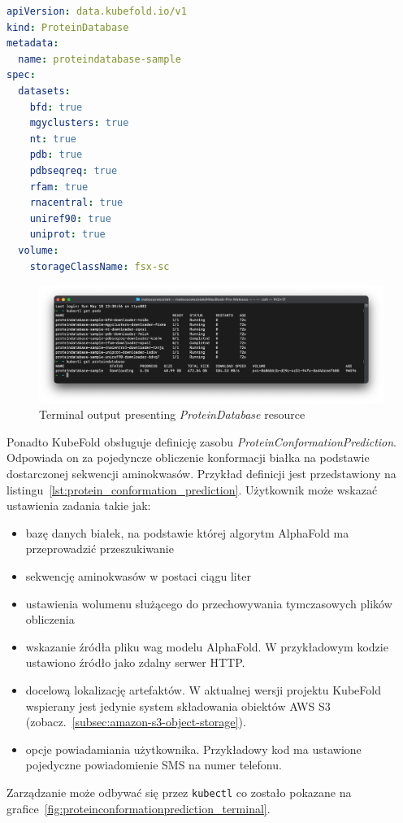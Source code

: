 \begin{lstlisting}[language=yaml,caption={Przykładowy kod YAML zasobu ProteinDatabase},label={lst:protein_database}]
apiVersion: data.kubefold.io/v1
kind: ProteinDatabase
metadata:
  name: proteindatabase-sample
spec:
  datasets:
    bfd: true
    mgyclusters: true
    nt: true
    pdb: true
    pdbseqreq: true
    rfam: true
    rnacentral: true
    uniref90: true
    uniprot: true
  volume:
    storageClassName: fsx-sc
\end{lstlisting}

\begin{figure}[htbp]
    \centering
    \includegraphics[width=\textwidth]{images/proteindatabase_terminal}
    \caption{Terminal output presenting \textit{ProteinDatabase} resource}
    \label{fig:proteindatabase_terminal}
\end{figure}

Ponadto KubeFold obsługuje definicję zasobu \textit{ProteinConformationPrediction}.
Odpowiada on za pojedyncze obliczenie konformacji białka na podstawie dostarczonej sekwencji aminokwasów.
Przykład definicji jest przedstawiony na listingu~\ref{lst:protein_conformation_prediction}.
Użytkownik może wskazać ustawienia zadania takie jak:
\begin{itemize}
    \item bazę danych białek, na podstawie której algorytm AlphaFold ma przeprowadzić przeszukiwanie
    \item sekwencję aminokwasów w postaci ciągu liter
    \item ustawienia wolumenu służącego do przechowywania tymczasowych plików obliczenia
    \item wskazanie źródła pliku wag modelu AlphaFold.
    W przykładowym kodzie ustawiono źródło jako zdalny serwer HTTP.
    \item docelową lokalizację artefaktów.
    W aktualnej wersji projektu KubeFold wspierany jest jedynie system składowania obiektów AWS S3 (zobacz.~\ref{subsec:amazon-s3-object-storage}).
    \item opcje powiadamiania użytkownika.
    Przykładowy kod ma ustawione pojedyczne powiadomienie SMS na numer telefonu.
\end{itemize}
Zarządzanie może odbywać się przez \texttt{kubectl} co zostało pokazane na grafice~\ref{fig:proteinconformationprediction_terminal}.


